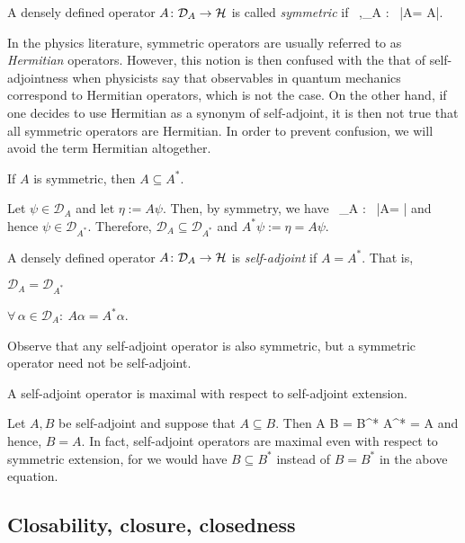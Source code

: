 \bd
A densely defined operator $A\colon\mathcal{D}_A\to\mathcal{H}$ is called \emph{symmetric} if
\bse
\forall \, \alpha,\beta \in {}_A : \ \langle\alpha|A\beta\rangle = \langle A\alpha|\beta\rangle.
\ese
\ed

\br
In the physics literature, symmetric operators are usually referred to as \emph{Hermitian} operators. However, this notion is then confused with the that of self-adjointness when physicists say that observables in quantum mechanics correspond to Hermitian operators, which is not the case. On the other hand, if one decides to use Hermitian as a synonym of self-adjoint, it is then not true that all symmetric operators are Hermitian. In order to prevent confusion, we will avoid the term Hermitian altogether. 
\er

\bp
If $A$ is symmetric, then $A\subseteq A^*$.
\ep

\bq
Let $\psi\in\mathcal{D}_A$ and let $\eta:=A\psi$. Then, by symmetry, we have
\bse
\forall \, \alpha\in {}_A : \ \langle\psi|A\alpha\rangle = \langle \eta|\alpha\rangle
\ese
and hence $\psi\in\mathcal{D}_{A^*}$. Therefore, $\mathcal{D}_A\subseteq \mathcal{D}_{A^*}$ and $A^*\psi:=\eta = A\psi$.
\eq

\bd
A densely defined operator $A\colon\mathcal{D}_A\to\mathcal{H}$ is \emph{self-adjoint} if $A=A^*$. That is,
\ben[label=(\roman*)]
\item $\mathcal{D}_A = \mathcal{D}_{A^*}$
\item $\forall \, \alpha \in \mathcal{D}_A : \ A\alpha = A^*\alpha$.
\een
\ed

\br
Observe that any self-adjoint operator is also symmetric, but a symmetric operator need not be self-adjoint. 
\er

\bc
\label{cor:selfasdjext}
A self-adjoint operator is maximal with respect to self-adjoint extension.
\ec

\bq
Let $A,B$ be self-adjoint and suppose that $A\subseteq B$. Then
\bse
A \subseteq B = B^* \subseteq A^* = A
\ese
and hence, $B=A$.
\eq
In fact, self-adjoint operators are maximal even with respect to symmetric extension, for we would have $B\subseteq B^*$ instead of $B=B^*$ in the above equation. 

\subsection{Closability, closure, closedness}


